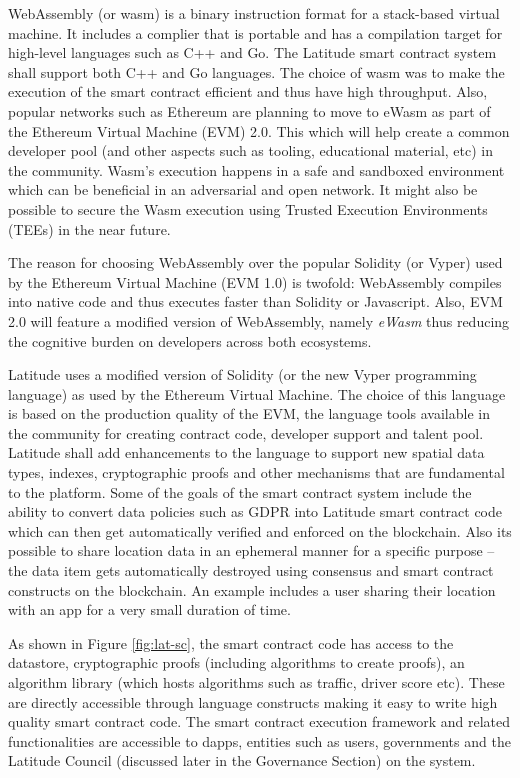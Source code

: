 WebAssembly (or wasm) is a binary instruction format for a stack-based virtual machine. It includes a complier that is
portable and has a compilation target for high-level languages such as C++ and Go. The Latitude smart contract system
shall support both C++ and Go languages. The choice of wasm was to make the execution of the smart contract efficient
and thus have high throughput. Also, popular networks such as Ethereum are planning to move to eWasm as part of the
Ethereum Virtual Machine (EVM) 2.0. This which will help create a common developer pool (and other aspects such as
tooling, educational material, etc) in the community. Wasm's execution happens in a safe and sandboxed
environment which can be beneficial in an adversarial and open network. It might also be possible to secure the Wasm
execution using Trusted Execution Environments (TEEs) in the near future.

The reason for choosing WebAssembly over the popular Solidity (or Vyper) used by the Ethereum Virtual Machine (EVM 1.0)
is twofold: 
WebAssembly compiles into native code and thus executes faster than Solidity or Javascript. Also, EVM 2.0 will feature
a modified version of WebAssembly, namely {\it eWasm} thus reducing the cognitive burden on developers across both
ecosystems.

Latitude uses a
modified version of Solidity (or the new Vyper programming language) as used by the Ethereum Virtual Machine. The choice
of this language is based on the production quality of the EVM, the language tools available in the community for
creating contract code, developer support and talent pool. Latitude shall add enhancements to the language to support
new spatial data types, indexes, cryptographic proofs and other mechanisms that are fundamental to the platform. Some of
the goals of the smart contract system include the ability to convert data policies such as GDPR \cite{gdpr} into
Latitude smart contract code which can then get automatically verified and enforced on the blockchain.  Also its
possible to share location data in an ephemeral manner for a specific purpose -- the data item gets automatically
destroyed using consensus and smart contract constructs on the blockchain. An example includes a user sharing their
location with an app for a very small duration of time.

As shown in Figure \ref{fig:lat-sc}, the smart contract code has access to the datastore, cryptographic proofs
(including algorithms to create proofs), an algorithm library (which hosts algorithms such as traffic, driver score
etc). These are directly accessible through language constructs making it easy to write high quality smart contract
code. The smart contract execution framework and related functionalities are accessible to dapps, entities such as
users, governments and the Latitude Council (discussed later in the Governance Section) on the system. 

